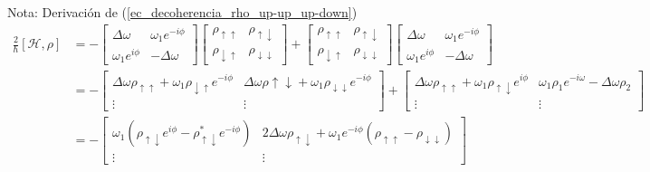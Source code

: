 \documentclass[a4paper,11pt]{book} %
\numberwithin{equation}{chapter}
\def\lp{\left(}
\def\rp{\right)}
\def\lc{\left[}
\def\rc{\right]}
\begin{document}
	\begin{mybox_blue}{Nota: Derivación de (\ref{ec_decoherencia_rho_up-up_up-down})}
		\begin{align*}
		\frac{2}{\hbar}\lc \mathcal{H} , \rho \rc & = - 
		\begin{bmatrix}
		\Delta \omega & \omega_1 e^{-i \phi} \\
		\omega_1 e^{i \phi} & - \Delta \omega
		\end{bmatrix} 
		\begin{bmatrix}
		\rho_{\uparrow \uparrow} & \rho_{\uparrow \downarrow} \\
		\rho_{\downarrow \uparrow} & \rho_{\downarrow \downarrow}
		\end{bmatrix}
		+
		\begin{bmatrix}
		\rho_{\uparrow \uparrow} & \rho_{\uparrow \downarrow} \\
		\rho_{\downarrow \uparrow} & \rho_{\downarrow \downarrow}
		\end{bmatrix}
		\begin{bmatrix}
		\Delta \omega & \omega_1 e^{-i \phi} \\
		\omega_1 e^{i \phi} & - \Delta \omega
		\end{bmatrix}  \\
		& = -  \begin{bmatrix}
		\Delta \omega \rho_{\uparrow \uparrow} +
		\omega_1 \rho_{\downarrow \uparrow} e^{-i \phi} 
		& \Delta \omega \rho{\uparrow \downarrow} + \omega_1 \rho_{\downarrow \downarrow} e^{-i \phi} \\
		\vdots & \vdots
		\end{bmatrix}
		+  \begin{bmatrix}
		\Delta \omega \rho_{\uparrow \uparrow} + \omega_1 \rho_{\uparrow \downarrow} e^{i \phi} & \omega_1 \rho_1 e^{-i \omega} - \Delta \omega \rho_2 \\
		\vdots & \vdots 
		\end{bmatrix} \\
		& = - \begin{bmatrix}
		\omega_1 \lp \rho_{\uparrow \downarrow} e^{i \phi} - \rho^{*}_{\uparrow \downarrow} e^{-i \phi} \rp & 
		2 \Delta \omega \rho_{\uparrow \downarrow} + \omega_1 e^{-i \phi} \lp \rho_{\uparrow \uparrow} - \rho_{\downarrow \downarrow} \rp \\
		\vdots & \vdots
		\end{bmatrix}
		\end{align*}
	\end{mybox_blue}
\end{document}
